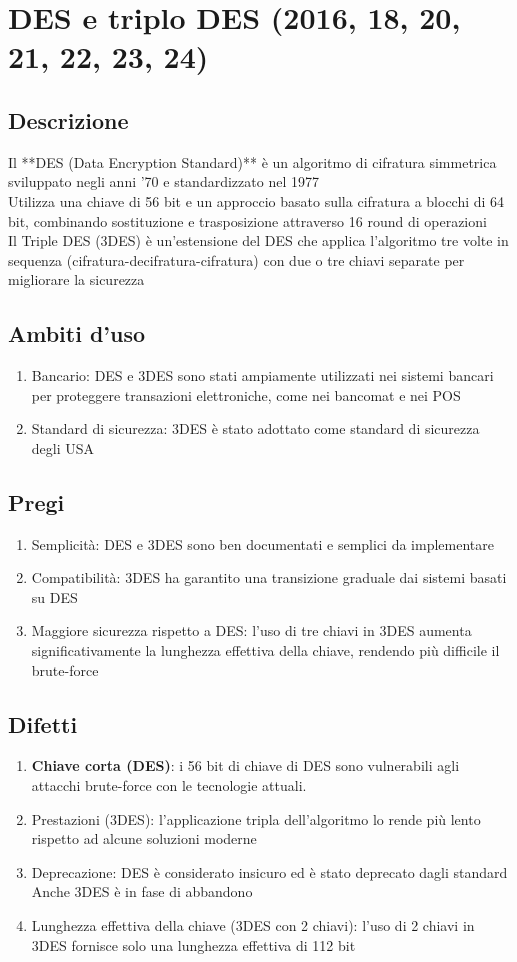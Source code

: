 \documentclass[10pt,oneside,a4paper]{article}
\begin{document}
\section{DES e triplo DES (2016, 18, 20, 21, 22, 23, 24)}
\subsection{Descrizione}
Il **DES (Data Encryption Standard)** è un algoritmo di cifratura simmetrica sviluppato negli anni '70 e standardizzato nel 1977\\
Utilizza una chiave di 56 bit e un approccio basato sulla cifratura a blocchi di 64 bit, combinando sostituzione e trasposizione attraverso 16 round di operazioni\\
Il Triple DES (3DES) è un'estensione del DES che applica l'algoritmo tre volte in sequenza (cifratura-decifratura-cifratura) con due o tre chiavi separate per migliorare la sicurezza\\
\subsection{Ambiti d'uso}
\begin{enumerate}
\item Bancario: DES e 3DES sono stati ampiamente utilizzati nei sistemi bancari per proteggere transazioni elettroniche, come nei bancomat e nei POS
\item Standard di sicurezza: 3DES è stato adottato come standard di sicurezza degli USA
\end{enumerate}
\subsection{Pregi}
\begin{enumerate}
\item Semplicità: DES e 3DES sono ben documentati e semplici da implementare
\item Compatibilità: 3DES ha garantito una transizione graduale dai sistemi basati su DES
\item Maggiore sicurezza rispetto a DES: l'uso di tre chiavi in 3DES aumenta significativamente la lunghezza effettiva della chiave, rendendo più difficile il brute-force
\end{enumerate}
\subsection{Difetti}
\begin{enumerate}
\item \textbf{Chiave corta (DES)}: i 56 bit di chiave di DES sono vulnerabili agli attacchi brute-force con le tecnologie attuali.
\item Prestazioni (3DES): l'applicazione tripla dell'algoritmo lo rende più lento rispetto ad alcune soluzioni moderne
\item Deprecazione: DES è considerato insicuro ed è stato deprecato dagli standard
Anche 3DES è in fase di abbandono
\item Lunghezza effettiva della chiave (3DES con 2 chiavi): l'uso di 2 chiavi in 3DES fornisce solo una lunghezza effettiva di 112 bit
\end{enumerate}
\end{document}
